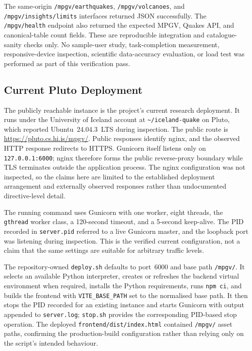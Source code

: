 \documentclass[12pt]{article}
\begin{document}
The same-origin \texttt{/mpgv/earthquakes}, \texttt{/mpgv/volcanoes}, and \texttt{/mpgv/insights/limits} interfaces returned JSON successfully. The \texttt{/mpgv/health} endpoint also returned the expected MPGV, Quakes API, and canonical-table count fields. These are reproducible integration and catalogue-sanity checks only. No sample-user study, task-completion measurement, responsive-device inspection, scientific data-accuracy evaluation, or load test was performed as part of this verification pass.

\subsection{Current Pluto Deployment}

The publicly reachable instance is the project's current research deployment. It runs under the University of Iceland account at \texttt{\textasciitilde/iceland-quake} on Pluto, which reported Ubuntu~24.04.3~LTS during inspection. The public route is \url{https://pluto.cs.hi.is/mpgv/}. Public responses identify nginx, and the observed HTTP response redirects to HTTPS. Gunicorn itself listens only on \texttt{127.0.0.1:6000}; nginx therefore forms the public reverse-proxy boundary while TLS terminates outside the application process. The nginx configuration was not inspected, so the claims here are limited to the established deployment arrangement and externally observed responses rather than undocumented directive-level detail.

The running command uses Gunicorn with one worker, eight threads, the \texttt{gthread} worker class, a 120-second timeout, and a 5-second keep-alive. The PID recorded in \texttt{server.pid} referred to a live Gunicorn master, and the loopback port was listening during inspection. This is the verified current configuration, not a claim that the same settings are suitable for arbitrary traffic levels.

The repository-owned \texttt{deploy.sh} defaults to port~6000 and base path \texttt{/mpgv/}. It selects an available Python interpreter, creates or refreshes the backend virtual environment when required, installs the Python requirements, runs \texttt{npm ci}, and builds the frontend with \texttt{VITE\_BASE\_PATH} set to the normalised base path. It then stops the PID recorded for an existing instance and starts Gunicorn with output appended to \texttt{server.log}; \texttt{stop.sh} provides the corresponding PID-based stop operation. The deployed \texttt{frontend/dist/index.html} contained \texttt{/mpgv/} asset paths, confirming the production-build configuration rather than relying only on the script's intended behaviour.
\end{document}
